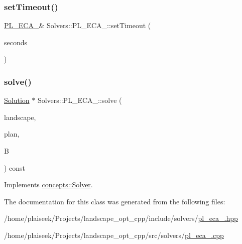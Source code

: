 \mbox{\label{class_solvers_1_1_p_l___e_c_a__3_a3f39771900d4abb806836b08373c005c}} 
\subsubsection{\texorpdfstring{set\+Timeout()}{setTimeout()}}
{\footnotesize\ttfamily \hyperlink{class_solvers_1_1_p_l___e_c_a__3}{P\+L\+\_\+\+E\+C\+A\+\_}\& Solvers\+::\+P\+L\+\_\+\+E\+C\+A\+\_\+::set\+Timeout (\begin{DoxyParamCaption}\item[{int}]{seconds }\end{DoxyParamCaption})\hspace{0.3cm}{\ttfamily [inline]}}

\mbox{\label{class_solvers_1_1_p_l___e_c_a__3_ae296efd0061d2fbf478732bc9c280202}} 
\subsubsection{\texorpdfstring{solve()}{solve()}}
{\footnotesize\ttfamily \hyperlink{class_solution}{Solution} $\ast$ Solvers\+::\+P\+L\+\_\+\+E\+C\+A\+\_\+::solve (\begin{DoxyParamCaption}\item[{const \hyperlink{class_landscape}{Landscape} \&}]{landscape,  }\item[{const \hyperlink{class_restoration_plan}{Restoration\+Plan} \&}]{plan,  }\item[{const double}]{B }\end{DoxyParamCaption}) const\hspace{0.3cm}{\ttfamily [virtual]}}



Implements \hyperlink{classconcepts_1_1_solver_af323ad29df1e7b87facd7dc007568c80}{concepts\+::\+Solver}.



The documentation for this class was generated from the following files\+:\begin{DoxyCompactItemize}
\item 
/home/plaiseek/\+Projects/landscape\+\_\+opt\+\_\+cpp/include/solvers/\hyperlink{pl__eca__3_8hpp}{pl\+\_\+eca\+\_.\+hpp}\item 
/home/plaiseek/\+Projects/landscape\+\_\+opt\+\_\+cpp/src/solvers/\hyperlink{pl__eca__3_8cpp}{pl\+\_\+eca\+\_.\+cpp}\end{DoxyCompactItemize}
